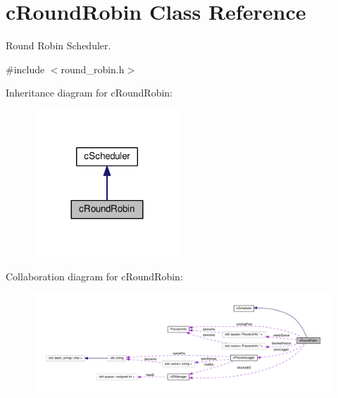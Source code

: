 \hypertarget{classcRoundRobin}{\section{c\-Round\-Robin \-Class \-Reference}
\label{dc/dcc/classcRoundRobin}
}


\-Round \-Robin \-Scheduler.  




{\ttfamily \#include $<$round\-\_\-robin.\-h$>$}



\-Inheritance diagram for c\-Round\-Robin\-:\nopagebreak
\begin{figure}[H]
\begin{center}
\leavevmode
\includegraphics[width=156pt]{d7/de9/classcRoundRobin__inherit__graph}
\end{center}
\end{figure}


\-Collaboration diagram for c\-Round\-Robin\-:\nopagebreak
\begin{figure}[H]
\begin{center}
\leavevmode
\includegraphics[width=350pt]{de/d42/classcRoundRobin__coll__graph}
\end{center}
\end{figure}
